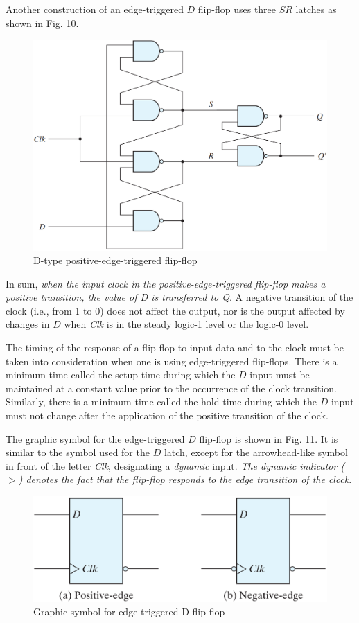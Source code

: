 Another construction of an edge-triggered $D$ flip-flop uses three $SR$ latches as shown in Fig. 10.
\begin{figure}[H]
  \centering
  \includegraphics[width=\linewidth]{img/fig-5.10.png}
  \caption{D-type positive-edge-triggered flip-flop}
  \label{fig:5.10}
\end{figure}

In sum, \textit{when the input clock in the positive-edge-triggered flip-flop makes a positive transition, the value of \textnormal{D} is transferred to \textnormal{Q}}. A negative transition of the clock (i.e., from 1 to 0) does not affect the output, nor is the output affected by changes in $D$ when \textit{Clk} is in the steady logic-1 level or the logic-0 level.

The timing of the response of a flip-flop to input data and to the clock must be taken into consideration when one is using edge-triggered flip-flops. There is a minimum time called the setup time during which the $D$ input must be maintained at a constant value prior to the occurrence of the clock transition. Similarly, there is a minimum time called the hold time during which the $D$ input must not change after the application of the positive transition of the clock.

The graphic symbol for the edge-triggered $D$ flip-flop is shown in Fig. 11. It is similar to the symbol used for the $D$ latch, except for the arrowhead-like symbol in front of the letter \textit{Clk}, designating a \textit{dynamic} input. \textit{The dynamic indicator ($>$) denotes the fact that the flip-flop responds to the edge transition of the clock}.
\begin{figure}[H]
  \centering
  \includegraphics[width=\linewidth]{img/fig-5.11.png}
  \caption{Graphic symbol for edge-triggered D flip-flop}
  \label{fig:5.11}
\end{figure}

